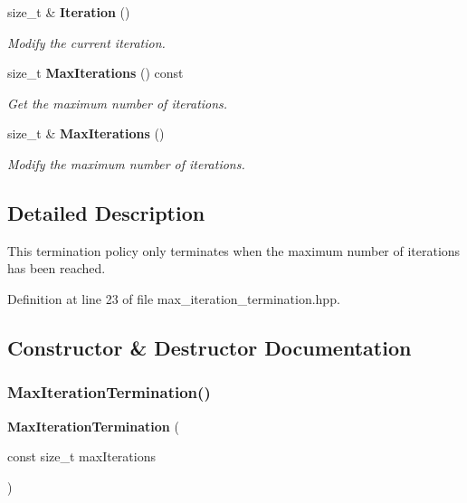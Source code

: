 \begin{DoxyCompactItemize}
size\+\_\+t \& \textbf{ Iteration} ()
\begin{DoxyCompactList}\small\item\em Modify the current iteration. \end{DoxyCompactList}\item 
size\+\_\+t \textbf{ Max\+Iterations} () const
\begin{DoxyCompactList}\small\item\em Get the maximum number of iterations. \end{DoxyCompactList}\item 
size\+\_\+t \& \textbf{ Max\+Iterations} ()
\begin{DoxyCompactList}\small\item\em Modify the maximum number of iterations. \end{DoxyCompactList}\end{DoxyCompactItemize}


\subsection{Detailed Description}
This termination policy only terminates when the maximum number of iterations has been reached. 

Definition at line 23 of file max\+\_\+iteration\+\_\+termination.\+hpp.



\subsection{Constructor \& Destructor Documentation}
\mbox{\label{classmlpack_1_1amf_1_1MaxIterationTermination_a98cfff3b4dc8dcf4679050651517114b}} 
\subsubsection{Max\+Iteration\+Termination()}
{\footnotesize\ttfamily \textbf{ Max\+Iteration\+Termination} (\begin{DoxyParamCaption}\item[{const size\+\_\+t}]{max\+Iterations }\end{DoxyParamCaption})\hspace{0.3cm}{\ttfamily [inline]}}



